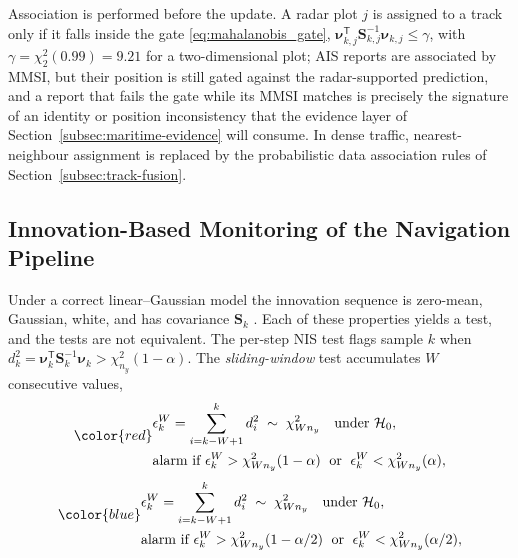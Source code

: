 \documentclass[graybox,envcountchap]{style/SNmono}
\providecommand{\DIFadd}[1]{{\protect\color{blue} #1}} %
\providecommand{\DIFdel}[1]{{\protect\color{red} #1}} %
\providecommand{\DIFaddbegin}{} %
\providecommand{\DIFaddend}{} %
\providecommand{\DIFdelbegin}{} %
\providecommand{\DIFdelend}{} %
\begin{document}
Association is performed before the update. A radar plot $j$ is assigned to a track only if it falls inside the gate \eqref{eq:mahalanobis_gate}, $\boldsymbol{\nu}_{k,j}^{\mathsf T}\mathbf{S}_{k,j}^{-1}\boldsymbol{\nu}_{k,j}\le\gamma$, with $\gamma=\chi^{2}_{2}(0.99)=9.21$ for a two-dimensional plot; AIS reports are associated by MMSI, but their position is still gated against the radar-supported prediction, and a report that fails the gate while its MMSI matches is precisely the signature of an identity or position inconsistency that the evidence layer of Section~\ref{subsec:maritime-evidence} will consume. In dense traffic, nearest-neighbour assignment is replaced by the probabilistic data association rules of Section~\ref{subsec:track-fusion}.

\subsection{Innovation-Based Monitoring of the Navigation Pipeline}
\label{subsec:maritime-innovation-monitoring}
Under a correct linear--Gaussian model the innovation sequence is zero-mean, Gaussian, white, and has covariance $\mathbf{S}_k$ \cite{barshalom2001_estimation,mehra_identification_1970}. Each of these properties yields a test, and the tests are not equivalent. The per-step NIS test flags sample $k$ when $d_k^{2}=\boldsymbol{\nu}_k^{\mathsf T}\mathbf{S}_k^{-1}\boldsymbol{\nu}_k>\chi^{2}_{n_y}(1-\alpha)$. The \emph{sliding-window} test accumulates $W$ consecutive values,
\DIFdelbegin \begin{displaymath}
\DIFdel{\begin{aligned}
&\epsilon_{k}^{W}=\sum_{i=k-W+1}^{k} d_i^{2}\;\sim\;\chi^{2}_{W n_y}\quad\text{under } \mathcal{H}_0,\\
&\text{alarm if } \epsilon_{k}^{W}>\chi^{2}_{W n_y}(1-\alpha)\;\text{ or }\;\epsilon_{k}^{W}<\chi^{2}_{W n_y}(\alpha),
\end{aligned}
}\end{displaymath}%
\DIFdelend \DIFaddbegin \begin{equation}
\DIFadd{\begin{aligned}
&\epsilon_{k}^{W}=\sum_{i=k-W+1}^{k} d_i^{2}\;\sim\;\chi^{2}_{W n_y}\quad\text{under } \mathcal{H}_0,\\
&\text{alarm if } \epsilon_{k}^{W}>\chi^{2}_{W n_y}(1-\alpha/2)\;\text{ or }\;\epsilon_{k}^{W}<\chi^{2}_{W n_y}(\alpha/2),
\end{aligned}
\label{eq:ch07-window-nis}
}\end{equation}\DIFaddend 
\end{document}
